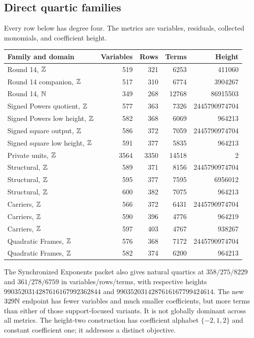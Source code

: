 \subsection{Direct quartic families}
Every row below has degree four. The metrics are variables, residuals, collected monomials, and coefficient height.
\begin{center}\small
\begin{tabular}{@{}lrrrr@{}}\toprule
Family and domain&Variables&Rows&Terms&Height\\\midrule
Round 14, $\mathbb Z$&519&321&6253&411060\\
Round 14 companion, $\mathbb Z$&517&310&6774&3904267\\
Round 14, $\mathbb N$&349&268&12768&86915503\\
Signed Powers quotient, $\mathbb Z$&577&363&7326&2445790974704\\
Signed Powers low height, $\mathbb Z$&582&368&6069&964213\\
Signed square output, $\mathbb Z$&586&372&7059&2445790974704\\
Signed square low height, $\mathbb Z$&591&377&5835&964213\\
Private units, $\mathbb Z$&3564&3350&14518&2\\
Structural, $\mathbb Z$&589&371&8156&2445790974704\\
Structural, $\mathbb Z$&595&377&7595&6956012\\
Structural, $\mathbb Z$&600&382&7075&964213\\
Carriers, $\mathbb Z$&566&372&6431&2445790974704\\
Carriers, $\mathbb Z$&590&396&4776&964219\\
Carriers, $\mathbb Z$&597&403&4767&938267\\
Quadratic Frames, $\mathbb Z$&576&368&7172&2445790974704\\
Quadratic Frames, $\mathbb Z$&582&374&6200&964213\\\bottomrule
\end{tabular}\end{center}
The Synchronized Exponents packet also gives natural quartics at $358/275/8229$ and $361/278/6759$ in variables/rows/terms, with respective heights
$9903520314287616167992362844$ and $9903520314287616167799424614$. The new $329\mathbb N$ endpoint has fewer variables and much smaller coefficients, but more terms than either of those support-focused variants. It is not globally dominant across all metrics. The height-two construction has coefficient alphabet $\{-2,1,2\}$ and constant coefficient one; it addresses a distinct objective.

